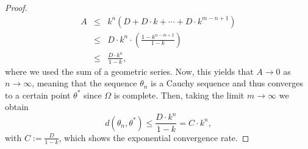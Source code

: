 \documentclass[10pt,a4paper]{amsart}
\begin{document}
\begin{proof}
    \begin{eqnarray*}
        A  & \leq &  k^{n}\left(D+D\cdot k+\cdots + D\cdot k^{m-n+1}\right) \\
           & \leq & D\cdot k^n  \cdot \left( \frac{1 - k^{n-m+2}}{1-k}\right) \\
          & \leq & \frac{D\cdot k^{n}}{1-k},
    \end{eqnarray*}
    where we used the sum of a geometric series. Now, this yields that $A\rightarrow 0$ as $n\rightarrow\infty$, meaning that the sequence $\theta_n$
    is a Cauchy sequence and thus converges to a certain point $\theta^*$
    since $\Omega$ is complete. 
    Then, taking the limit $m\rightarrow \infty$ we obtain
    \[
    d(\theta_n,\theta^*) \leq \frac{D\cdot k^{n}}{1-k} = C\cdot k^n,
    \]
    with $C:=\frac{D}{1-k}$, which shows the exponential convergence rate.
\end{proof}
\end{document}
